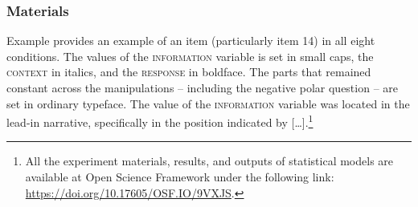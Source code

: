 \documentclass[output=paper,colorlinks,citecolor=brown]{langscibook}
\begin{document}


\subsubsection{Materials}

Example  provides an example of an item (particularly item 14) in all eight conditions. The values of the \textsc{information} variable is set in small caps, the \textsc{context} in italics, and the \textsc{response} in boldface. The parts that remained constant across the manipulations -- including the negative polar question -- are set in ordinary typeface. The value of the \textsc{information} variable was located in the lead-in narrative, specifically in the position indicated by [\dots].\footnote{All the experiment materials, results, and outputs of statistical models are available at Open Science Framework under the following link: \url{https://doi.org/10.17605/OSF.IO/9VXJS}.}
\end{document}
